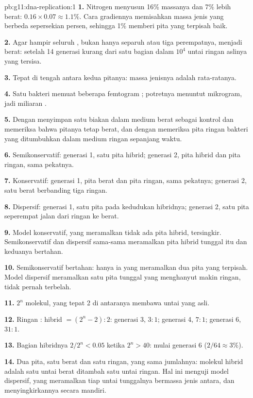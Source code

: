 \begin{solution}{pb:g11:dna-replication:1}
\textbf{1.} Nitrogen menyusun 16\% massanya dan 7\% lebih berat:
$0.16 \times 0.07 \approx 1.1\%$. Cara gradiennya memisahkan massa
jenis yang berbeda sepersekian persen, sehingga 1\% memberi pita yang
terpisah baik.

\textbf{2.} Agar hampir seluruh , bukan hanya separuh atau tiga
perempatnya, menjadi berat: setelah 14 generasi kurang dari satu bagian
dalam $10^4$ untai ringan aslinya yang tersisa.

\textbf{3.} Tepat di tengah antara kedua pitanya: massa jenisnya adalah
rata-ratanya.

\textbf{4.} Satu bakteri memuat beberapa femtogram ; potretnya
menuntut mikrogram, jadi miliaran .

\textbf{5.} Dengan menyimpan satu biakan dalam medium berat sebagai
kontrol dan memeriksa bahwa pitanya tetap berat, dan dengan memeriksa
pita ringan bakteri yang ditumbuhkan dalam medium ringan sepanjang waktu.

\textbf{6.} Semikonservatif: generasi 1, satu pita hibrid; generasi 2,
pita hibrid dan pita ringan, sama pekatnya.

\textbf{7.} Konservatif: generasi 1, pita berat dan pita ringan, sama
pekatnya; generasi 2, satu berat berbanding tiga ringan.

\textbf{8.} Dispersif: generasi 1, satu pita pada kedudukan hibridnya;
generasi 2, satu pita seperempat jalan dari ringan ke berat.

\textbf{9.} Model konservatif, yang meramalkan tidak ada pita hibrid,
tersingkir. Semikonservatif dan dispersif sama-sama meramalkan pita
hibrid tunggal itu dan keduanya bertahan.

\textbf{10.} Semikonservatif bertahan: hanya ia yang meramalkan dua
pita yang terpisah. Model dispersif meramalkan satu pita tunggal yang
menghanyut makin ringan, tidak pernah terbelah.

\textbf{11.} $2^n$ molekul, yang tepat 2 di antaranya membawa untai
yang asli.

\textbf{12.} Ringan : hibrid $= (2^n - 2) : 2$: generasi 3, $3:1$;
generasi 4, $7:1$; generasi 6, $31:1$.

\textbf{13.} Bagian hibridnya $2/2^n < 0.05$ ketika $2^n > 40$: mulai
generasi 6 ($2/64 \approx 3\%$).

\textbf{14.} Dua pita, satu berat dan satu ringan, yang sama
jumlahnya: molekul hibrid adalah satu untai berat ditambah satu untai
ringan. Hal ini menguji model dispersif, yang meramalkan tiap untai
tunggalnya bermassa jenis antara, dan menyingkirkannya secara mandiri.


\end{solution}
